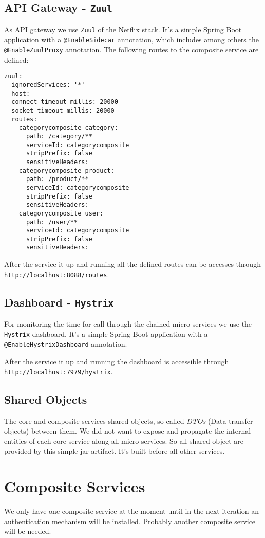 \documentclass[11pt]{article}
\begin{document}
	\subsection{API Gateway - \texttt{Zuul}}
	As API gateway we use \texttt{Zuul} of the Netflix stack.  It's a simple Spring Boot application with a \texttt{@EnableSidecar} annotation, which includes among others the \texttt{@EnableZuulProxy} annotation. The following routes to the composite service are defined:	
	\begin{lstlisting}
zuul:
  ignoredServices: '*'
  host:
  connect-timeout-millis: 20000
  socket-timeout-millis: 20000
  routes:
    categorycomposite_category:
      path: /category/**
      serviceId: categorycomposite
      stripPrefix: false
      sensitiveHeaders:
    categorycomposite_product:
      path: /product/**
      serviceId: categorycomposite
      stripPrefix: false
      sensitiveHeaders:
    categorycomposite_user:
      path: /user/**
      serviceId: categorycomposite
      stripPrefix: false
      sensitiveHeaders:
	\end{lstlisting}
	After the service it up and running all the defined routes can be accesses through	\texttt{http://localhost:8088/routes}.

	\subsection{Dashboard - \texttt{Hystrix}}
	For monitoring the time for call through the chained micro-services we use the \texttt{Hystrix} dashboard.  It's a simple Spring Boot application with a
	\texttt{@EnableHystrixDashboard} annotation. 

	After the service it up and running the dashboard is accessible through \texttt{http://localhost:7979/hystrix}.

	\subsection{Shared Objects}
	The core and composite services shared objects, so called \textit{DTOs} (Data transfer objects) between them. We did not want to expose and propagate the internal entities of each core service along all micro-services. So all shared object are provided by this simple jar artifact. It's built before all other services.
	
	\section{Composite Services}
	We only have one composite service at the moment until in the next iteration an authentication mechanism will be installed. Probably another composite service will be needed. 
\end{document}
